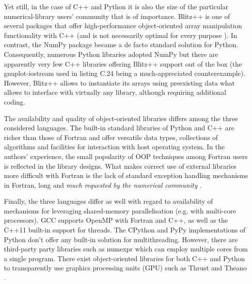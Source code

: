 \documentclass[final,5p,times,twocolumn]{elsarticle}
\begin{document}
  Yet still, in the case of C++ and Python it is also the size of the particular
    numerical-library users' community that is of importance.
  Blitz++ is one of several packages that offer high-performance object-oriented
    array manipulation functionality with C++ (and is not necessarily optimal for every
    purpose \citep{Iglberger_et_al_2012}).
  In contrast, the NumPy package became a de facto standard solution for Python.
  Consequently, numerous Python libraries adopted NumPy but
    there are apparently very few C++ libraries offering Blitz++ support out of the box
    (the gnuplot-iostream used in listing C.24 being a much-appreciated counterexample).
  However, Blitz++ allows to instantiate its arrays using preexisting data what
    allows to interface with virtually any library, although requiring additional
    coding.
  
  The availability and quality of object-oriented 
    libraries differs among the three considered languages.
  The built-in standard libraries of Python and C++ are richer than
    those of Fortran and offer versatile data types, collections of
    algorithms and facilities for interaction with host operating system.
  In the authors' experience, the small popularity of OOP techniques among
    Fortran users is reflected in the library designs.
  What makes correct use of external libraries more difficult with Fortran
    is the lack of standard exception handling mechanisms in Fortran,
    long and {\em much requested by the numerical community} \citep[][Foreword]{Press_et_al_1996}.

  Finally, the three languages differ as well with regard to availability of 
    mechanisms for leveraging shared-memory parallelisation (e.g. with multi-core processors).
  GCC supports OpenMP with Fortran and C++, as well as the C++11 built-in support for threads.
  The CPython and PyPy implementations of Python don't offer any
    built-in solution for multithreading. 
  However, there are third-party party libraries such as numexpr which can employ multiple cores from
    a single program.
  There exist object-oriented libraries for both C++ and Python to 
    transparently use graphics processing units (GPU) such as Thrust \citep{Thrust}
    and Theano \citep{Bergstra_et_al_2010}. 
  
\end{document}
